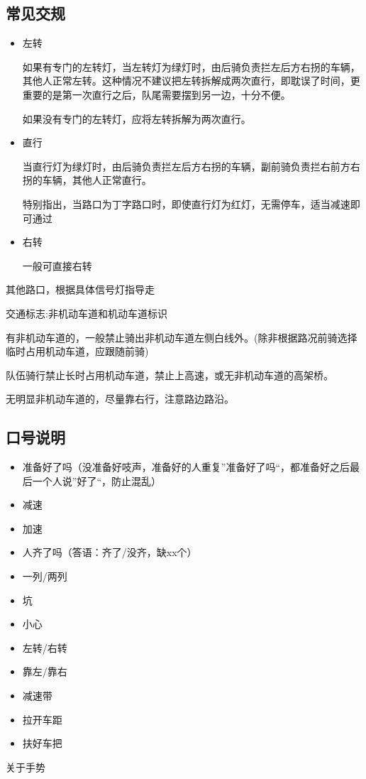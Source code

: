 \documentclass{ctexbook}
\begin{document}
\subsection{常见交规}
\begin{itemize}
    \item 左转
    
    如果有专门的左转灯，当左转灯为绿灯时，由后骑负责拦左后方右拐的车辆，其他人正常左转。这种情况不建议把左转拆解成两次直行，即耽误了时间，更重要的是第一次直行之后，队尾需要摆到另一边，十分不便。

    如果没有专门的左转灯，应将左转拆解为两次直行。
    \item 直行
    
    当直行灯为绿灯时，由后骑负责拦左后方右拐的车辆，副前骑负责拦右前方右拐的车辆，其他人正常直行。

    特别指出，当路口为丁字路口时，即使直行灯为红灯，无需停车，适当减速即可通过
    \item 右转
    
    一般可直接右转
\end{itemize}
其他路口，根据具体信号灯指导走
 
交通标志:非机动车道和机动车道标识

有非机动车道的，一般禁止骑出非机动车道左侧白线外。(除非根据路况前骑选择临时占用机动车道，应跟随前骑)

队伍骑行禁止长时占用机动车道，禁止上高速，或无非机动车道的高架桥。

无明显非机动车道的，尽量靠右行，注意路边路沿。
\subsection{口号说明}
\begin{itemize}
\item 准备好了吗（没准备好吱声，准备好的人重复''准备好了吗``，都准备好之后最后一个人说''好了``，防止混乱）
\item 减速
\item 加速
\item 人齐了吗（答语：齐了/没齐，缺xx个）
\item 一列/两列
\item 坑
\item 小心
\item 左转/右转
\item 靠左/靠右
\item 减速带
\item 拉开车距
\item 扶好车把
\end{itemize}
关于手势
\end{document}
